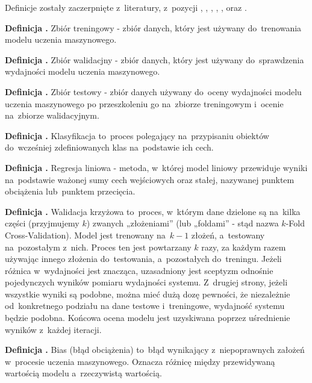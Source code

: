 Definicje zostały zaczerpnięte z~literatury, z~pozycji \cite{Fenner2020}, \cite{Geron2020}, \cite{Goodfellow2016},
\cite{Seenappa}, \cite{vanDerMaaten}, \cite{strGoogle} oraz \cite{strIbm}.

\noindent
\textbf{Definicja .}
\incrementdefinitionIndex
Zbiór treningowy - zbiór danych, który jest używany do~trenowania modelu uczenia maszynowego.

\noindent
\textbf{Definicja .}
\incrementdefinitionIndex
Zbiór walidacjny - zbiór danych, który jest używany do~sprawdzenia wydajności modelu uczenia maszynowego.

\noindent
\textbf{Definicja .}
\incrementdefinitionIndex
Zbiór testowy - zbiór danych używany do~oceny wydajności modelu uczenia maszynowego
po przeszkoleniu go na~zbiorze treningowym i~ocenie na~zbiorze walidacyjnym.

\noindent
\textbf{Definicja .}
\incrementdefinitionIndex
Klasyfikacja to~proces polegający na~przypisaniu obiektów do~wcześniej zdefiniowanych klas na~podstawie ich cech.

\noindent
\textbf{Definicja .}
\incrementdefinitionIndex
Regresja liniowa - metoda, w~której model liniowy przewiduje wyniki na~podstawie ważonej sumy cech wejściowych oraz stałej,
nazywanej punktem obciążenia lub~punktem przecięcia.

\noindent
\textbf{Definicja .}
\incrementdefinitionIndex
Walidacja krzyżowa to~proces, w~którym dane dzielone są na~kilka części (przyjmujemy $k$) zwanych „złożeniami”
(lub „foldami” - stąd nazwa $k$-Fold Cross-Validation). Model jest trenowany na~$k-1$ złożeń, a~testowany na~pozostałym z~nich.
Proces ten jest powtarzany $k$ razy, za każdym razem używając innego złożenia do~testowania, a~pozostałych do~treningu.
Jeżeli różnica w~wydajności jest znacząca, uzasadniony jest sceptyzm odnośnie pojedynczych wyników pomiaru wydajności systemu.
Z~drugiej strony, jeżeli wszystkie wyniki są podobne, można mieć dużą dozę pewności, że niezależnie od~konkretnego podziału
na dane testowe i~treningowe, wydajność systemu będzie podobna.
Końcowa ocena modelu jest uzyskiwana poprzez uśrednienie wyników z~każdej iteracji.

\noindent
\textbf{Definicja .}
\incrementdefinitionIndex
Bias (błąd obciążenia) to~błąd wynikający z~niepoprawnych założeń w~procesie uczenia maszynowego.
Oznacza różnicę między przewidywaną wartością modelu a~rzeczywistą wartością.

